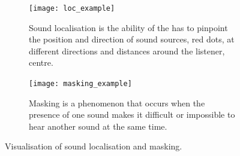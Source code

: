 \begin{figure}
    \centering
    \begin{subfigure}[t]{0.49\textwidth}
        \centering
        \texttt{[image: loc\_example]}
        \caption{Sound localisation is the ability of the \acrshort{has} to pinpoint the position and direction of sound sources, red dots, at different directions and distances around the listener, centre.}
        \label{fig:loc-example}
    \end{subfigure}
    \hfill
    \begin{subfigure}[t]{0.49\textwidth}
        \centering
        \texttt{[image: masking\_example]}
        \caption{Masking is a phenomenon that occurs when the presence of one sound makes it difficult or impossible to hear another sound at the same time.}
        \label{fig:masking-example}
    \end{subfigure}

       \caption[Visualisation of sound localisation and masking]{Visualisation of sound localisation and masking.}
       \label{fig:loc-masking-examples}
\end{figure}


